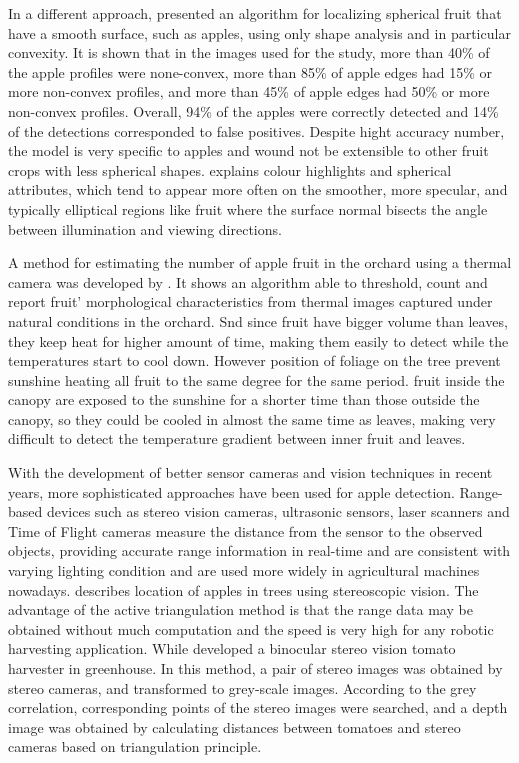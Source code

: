 \documentclass[review]{elsarticle}
\begin{document}
    In a different approach, \cite{Kelman_2014} presented an algorithm for localizing spherical fruit that have a smooth surface, such as apples, using only shape analysis and in particular convexity. It is shown that in the images used for the study, more than 40\% of the apple profiles were none-convex, more than 85\% of apple edges had 15\% or more non-convex profiles, and more than 45\% of apple edges had 50\% or more non-convex profiles. Overall, 94\% of the apples were correctly detected and 14\% of the detections corresponded to false positives. Despite hight accuracy number, the model is very specific to apples and wound not be extensible to other fruit crops with less spherical shapes. \cite{Kapach_2012} explains colour highlights and spherical attributes, which tend to appear more often on the smoother, more specular, and typically elliptical regions like fruit where the surface normal bisects the angle between illumination and viewing directions.

    A method for estimating the number of apple fruit in the orchard using a thermal camera was developed by \cite{Stajnko2004}. It shows an algorithm able to threshold, count and report fruit’ morphological characteristics from thermal images captured under natural conditions in the orchard. Snd since fruit have bigger volume than leaves, they keep heat for higher amount of time, making them easily to detect while the temperatures start to cool down. However position of foliage on the tree prevent sunshine heating all fruit to the same degree for the same period. fruit inside the canopy are exposed to the sunshine for a shorter time than those outside the canopy, so they could be cooled in almost the same time as leaves, making very difficult to detect the temperature gradient between inner fruit and leaves.

    With the development of better sensor cameras and vision techniques in recent years, more sophisticated approaches have been used for apple detection. Range-based devices such as stereo vision cameras, ultrasonic sensors, laser scanners and Time of Flight cameras measure the distance from the sensor to the observed objects, providing accurate range information in real-time and are consistent with varying lighting condition and are used more widely in agricultural machines nowadays. \cite{Si_2015} describes location of apples in trees using stereoscopic vision. The advantage of the active triangulation method is that the range data may be obtained without much computation and the speed is very high for any robotic harvesting application. While \cite{Huanyu_2008} developed a binocular stereo vision tomato harvester in greenhouse. In this method, a pair of stereo images was obtained by stereo cameras, and transformed to grey-scale images. According to the grey correlation, corresponding points of the stereo images were searched, and a depth image was obtained by calculating distances between tomatoes and stereo cameras based on triangulation principle. 
\end{document}
